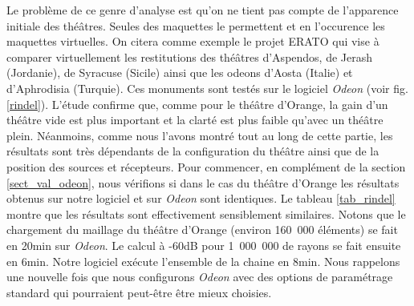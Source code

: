 Le problème de ce genre d'analyse est qu'on ne tient pas compte de l'apparence initiale des théâtres. Seules des maquettes le permettent et en l'occurence les maquettes virtuelles. On citera comme exemple le projet ERATO \cite{rindel} qui vise à comparer virtuellement les restitutions des théâtres d'Aspendos, de Jerash (Jordanie), de Syracuse (Sicile) ainsi que les \glspl{odeon} d'Aosta (Italie) et d'Aphrodisia (Turquie). Ces monuments sont testés sur le logiciel \textit{Odeon} (voir fig. \ref{rindel}). L'étude confirme que, comme pour le théâtre d'Orange, la gain d'un théâtre vide est plus important et la clarté est plus faible qu'avec un théâtre plein. Néanmoins, comme nous l'avons montré tout au long de cette partie, les résultats sont très dépendants de la configuration du théâtre ainsi que de la position des sources et récepteurs. Pour commencer, en complément de la section \ref{sect_val_odeon}, nous vérifions si dans le cas du théâtre d'Orange les résultats obtenus sur notre logiciel et sur \textit{Odeon} sont identiques. Le tableau \ref{tab_rindel} montre que les résultats sont effectivement sensiblement similaires. Notons que le chargement du maillage du théâtre d'Orange (environ 160~000 éléments) se fait en 20min sur \textit{Odeon}. Le calcul à -60dB pour 1~000~000 de rayons se fait ensuite en 6min. Notre logiciel exécute l'ensemble de la chaine en 8min. Nous rappelons une nouvelle fois que nous configurons \textit{Odeon} avec des options de paramétrage standard qui pourraient peut-être être mieux choisies.

